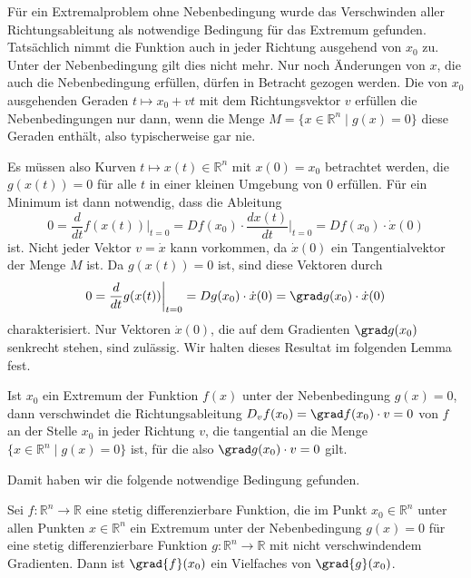 Für ein Extremalproblem ohne Nebenbedingung wurde das Verschwinden
aller Richtungsableitung als notwendige Bedingung für das
Extremum gefunden.
Tatsächlich nimmt die Funktion auch in jeder Richtung ausgehend
von $x_0$ zu.
Unter der Nebenbedingung gilt dies nicht mehr.
Nur noch Änderungen von $x$, die auch die Nebenbedingung
erfüllen, dürfen in Betracht gezogen werden.
Die von $x_0$ ausgehenden Geraden $t\mapsto x_0+vt$ mit dem
Richtungsvektor $v$ erfüllen die Nebenbedingungen nur dann, wenn
die Menge $M=\{x\in\mathbb{R}^n \mid g(x)=0\}$ diese Geraden enthält,
also typischerweise gar nie.

Es müssen also Kurven $t\mapsto x(t)\in\mathbb{R}^n$ mit $x(0)=x_0$
betrachtet werden, die $g(x(t))=0$ für alle $t$ in einer kleinen Umgebung
von $0$ erfüllen.
Für ein Minimum ist dann notwendig, dass die Ableitung
\begin{equation}
0
=
\frac{d}{dt} f(x(t))\bigg|_{t=0}
=
Df(x_0)\cdot \frac{dx(t)}{dt}\bigg|_{t=0}
=
Df(x_0)\cdot \dot{x}(0)
\label{buch:fuvar:nebenbedingungen:eqn:gradf}
\end{equation}
ist.
Nicht jeder Vektor $v=\dot{x}$ kann vorkommen, da $\dot{x}(0)$ ein
Tangentialvektor der Menge $M$ ist.
Da $g(x(t))=0$ ist, sind diese Vektoren durch
\begin{equation}
0
=
\frac{d}{dt}g(x(t))\bigg|_{t=0}
=
Dg(x_0)\cdot \dot{x}(0)
=
\grad g(x_0)\cdot \dot{x}(0)
\label{buch:fuvar:nebenbedingungen:eqn:gradg}
\end{equation}
charakterisiert.
Nur Vektoren $\dot{x}(0)$, die auf dem Gradienten $\grad g(x_0)$ 
senkrecht stehen, sind zulässig.
Wir halten dieses Resultat im folgenden Lemma fest.

\begin{lemma}
\label{buch:fuvar:nebenbedingungen:lemma:nebenbedingungen}
Ist $x_0$ ein Extremum der Funktion $f(x)$ unter der Nebenbedingung
$g(x)=0$, dann verschwindet die Richtungsableitung
\(
D_vf(x_0) = \grad f(x_0)\cdot v = 0
\)
von $f$ an der Stelle $x_0$ in jeder Richtung $v$, die tangential
an die Menge $\{x\in\mathbb{R}^n \mid g(x)=0\}$ ist, für die also
$\grad g(x_0)\cdot v=0$ gilt.
\end{lemma}

Damit haben wir die folgende notwendige Bedingung gefunden.
%

\begin{satz}
\label{buch:fuvar:nebenbedingungen:satz:nebenbedingung}
Sei $f\colon\mathbb{R}^n\to\mathbb{R}$ eine stetig differenzierbare
Funktion, die im Punkt $x_0\in\mathbb{R}^n$ unter allen Punkten
$x\in\mathbb{R}^n$ ein Extremum unter der Nebenbedingung
$g(x)=0$ für eine stetig differenzierbare Funktion
$g\colon\mathbb{R}^n\to\mathbb{R}$ mit nicht verschwindendem Gradienten.
Dann ist $\grad{f}(x_0)$ ein Vielfaches von $\grad{g}(x_0)$.
\end{satz}

